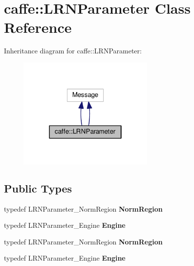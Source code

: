 \hypertarget{classcaffe_1_1_l_r_n_parameter}{}\section{caffe\+:\+:L\+R\+N\+Parameter Class Reference}
\label{classcaffe_1_1_l_r_n_parameter}


Inheritance diagram for caffe\+:\+:L\+R\+N\+Parameter\+:
\nopagebreak
\begin{figure}[H]
\begin{center}
\leavevmode
\includegraphics[width=190pt]{classcaffe_1_1_l_r_n_parameter__inherit__graph}
\end{center}
\end{figure}
\subsection*{Public Types}
\begin{DoxyCompactItemize}
\item 
\mbox{\label{classcaffe_1_1_l_r_n_parameter_a7c3e4975fe7d3e17ddcd881e81ed8228}} 
typedef L\+R\+N\+Parameter\+\_\+\+Norm\+Region {\bfseries Norm\+Region}
\item 
\mbox{\label{classcaffe_1_1_l_r_n_parameter_af27da4596f9851874b63c8b1b6307600}} 
typedef L\+R\+N\+Parameter\+\_\+\+Engine {\bfseries Engine}
\item 
\mbox{\label{classcaffe_1_1_l_r_n_parameter_a7c3e4975fe7d3e17ddcd881e81ed8228}} 
typedef L\+R\+N\+Parameter\+\_\+\+Norm\+Region {\bfseries Norm\+Region}
\item 
\mbox{\label{classcaffe_1_1_l_r_n_parameter_af27da4596f9851874b63c8b1b6307600}} 
typedef L\+R\+N\+Parameter\+\_\+\+Engine {\bfseries Engine}
\end{DoxyCompactItemize}
